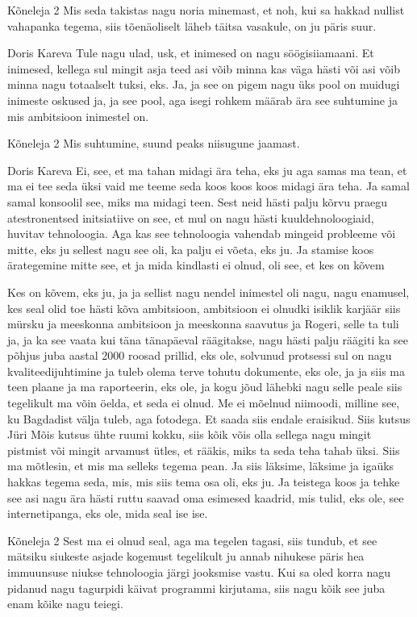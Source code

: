 Kõneleja 2
Mis seda takistas nagu noria minemast, et noh, kui sa hakkad nullist vahapanka tegema, siis tõenäoliselt läheb täitsa vasakule, on ju päris suur. 

Doris Kareva
Tule nagu ulad, usk, et inimesed on nagu söögisiiamaani. Et inimesed, kellega sul mingit asja teed asi võib minna kas väga hästi või asi võib minna nagu totaalselt tuksi, eks. Ja, ja see on pigem nagu üks pool on muidugi inimeste oskused ja, ja see pool, aga isegi rohkem määrab ära see suhtumine ja mis ambitsioon inimestel on. 

Kõneleja 2
Mis suhtumine, suund peaks niisugune jaamast. 

Doris Kareva
Ei, see, et ma tahan midagi ära teha, eks ju aga samas ma tean, et ma ei tee seda üksi vaid me teeme seda koos koos koos midagi ära teha. Ja samal samal konsoolil see, miks ma midagi teen. Sest neid hästi palju kõrvu praegu atestronentsed initsiatiive on see, et mul on nagu hästi kuuldehnoloogiaid, huvitav tehnoloogia. Aga kas see tehnoloogia vahendab mingeid probleeme või mitte, eks ju sellest nagu see oli, ka palju ei võeta, eks ju. Ja stamise koos ärategemine mitte see, et ja mida kindlasti ei olnud, oli see, et kes on kõvem 

Kes on kõvem, eks ju, ja ja sellist nagu nendel inimestel oli nagu, nagu enamusel, kes seal olid toe hästi kõva ambitsioon, ambitsioon ei olnudki isiklik karjäär siis mürsku ja meeskonna ambitsioon ja meeskonna saavutus ja Rogeri, selle ta tuli ja, ja ka see vaata kui täna tänapäeval räägitakse, nagu hästi palju räägiti ka see põhjus juba aastal 2000 roosad prillid, eks ole, solvunud protsessi sul on nagu kvaliteedijuhtimine ja tuleb olema terve tohutu dokumente, eks ole, ja ja siis ma teen plaane ja ma raporteerin, eks ole, ja kogu jõud lähebki nagu selle peale siis tegelikult ma võin öelda, et seda ei olnud. Me ei mõelnud niimoodi, milline see, ku Bagdadist välja tuleb, aga fotodega. Et saada siis endale eraisikud. Siis kutsus Jüri Mõis kutsus ühte ruumi kokku, siis kõik võis olla sellega nagu mingit pistmist või mingit arvamust ütles, et rääkis, miks ta seda teha tahab üksi. Siis ma mõtlesin, et mis ma selleks tegema pean. Ja siis läksime, läksime ja igaüks hakkas tegema seda, mis, mis siis tema osa oli, eks ju. Ja teistega koos ja tehke see asi nagu ära hästi ruttu saavad oma esimesed kaadrid, mis tulid, eks ole, see internetipanga, eks ole, mida seal ise ise. 

Kõneleja 2
Sest ma ei olnud seal, aga ma tegelen tagasi, siis tundub, et see mätsiku siukeste asjade kogemust tegelikult ju annab nihukese päris hea immuunsuse niukse tehnoloogia järgi jooksmise vastu. Kui sa oled korra nagu pidanud nagu tagurpidi käivat programmi kirjutama, siis nagu kõik see juba enam kõike nagu teiegi. 

